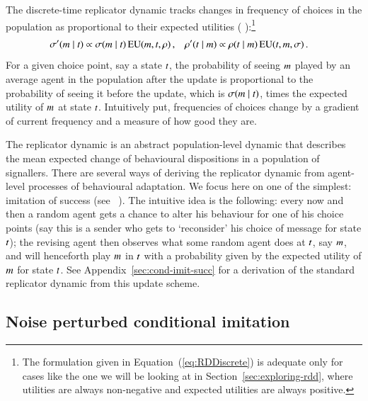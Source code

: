 \documentclass[11pt,english]{article}
\numberwithin{equation}{section}
\newcommand{\citepbjps}[1]{(\citeauthor{#1} \citeyear{#1})}
\newcommand{\citepbjpspre}[2]{(#1~\citeauthor{#2} \citeyear{#2})}
\begin{document}
The discrete-time replicator dynamic tracks changes in frequency of choices in the population
as proportional to their expected utilities
\citepbjps{HofbauerSigmund1998:Evolutionary-Ga}:\footnote{The formulation given in
  Equation~(\ref{eq:RDDiscrete}) is adequate only for cases like the one we will be looking at
  in Section~\ref{sec:exploring-rdd}, where utilities are always non-negative and expected
  utilities are always positive.}
\begin{align}
  \label{eq:RDDiscrete}
  \sigma'(m \mid t) & \propto \sigma(m \mid t) \thinspace
    \mathrm{EU}(m, t,\rho)\,, & \rho'(t \mid m) & \propto \rho(t \mid m) \thinspace
    \mathrm{EU}(t, m,\sigma)\,.   
\end{align}
For a given choice point, say a state $t$, the probability of seeing $m$ played by an
average agent in the population after the update is proportional to the probability of
seeing it before the update, which is $\sigma(m \mid t)$, times the
expected utility of $m$ at state $t$. Intuitively put, frequencies of choices change
by a gradient of current frequency and a measure of how good they are.

The replicator dynamic is an abstract population-level dynamic that describes the mean expected
change of behavioural dispositions in a population of signallers. There are several ways of
deriving the replicator dynamic from agent-level processes of behavioural adaptation. We focus
here on one of the simplest: imitation of success
\citepbjpspre{see}{Sandholm2010:Population-Game}. The intuitive idea is the following: every now and then a random agent gets a chance to alter his behaviour for one
of his choice points (say this is a sender who gets to `reconsider' his choice of message
for state $t$); the revising agent then observes what some random agent does at $t$,
say $m$, and will henceforth play $m$ in $t$ with a probability given by the
expected utility of $m$ for state $t$. See
Appendix~\ref{sec:cond-imit-succ} for a derivation of the standard replicator dynamic from this
update scheme.

\subsection{Noise perturbed conditional imitation}
\label{sec:noisy-repl-dynam}
\end{document}
